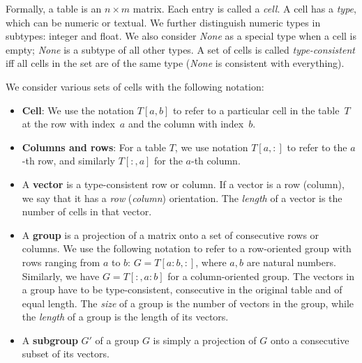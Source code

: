 \documentclass{sig-alternate-05-2015}
\newcommand{\groups}{\ensuremath{\mathcal{G}}\xspace}
\begin{document}
Formally, a table is an $n \times m$ matrix. Each entry is called a \textit{cell}.
A cell has a {\em type}, which can be numeric or textual. We further distinguish numeric types in subtypes: integer and float. We also consider \textit{None} as a special type when a cell is empty; \textit{None} is a subtype of all other types.
A set of cells is called \textit{type-consistent} iff all cells in the set are of the same type (\textit{None} is consistent with everything).

We consider various sets of cells with the following notation:
\begin{itemize}
  \item {\bf Cell}: We use the notation $T[a,b]$ to refer to a particular cell in the table~$T$ at the row with index~$a$ and the column with index~$b$.

  \item {\bf Columns and rows}: For a table $T$, we use notation $T[a,{:}]$ to refer to the $a$-th row, and similarly $T[{:},a]$ for the $a$-th column. %

  \item
  A \textbf{vector} is a type-consistent row or column.
  If a vector is a row (column), we say that it has a \textit{row} (\textit{column}) orientation. The \textit{length} of a vector is the number of cells in that vector.

  \item
  A \textbf{group} is a projection of a matrix onto a set of consecutive rows or columns. %
  We use the following notation to refer to a row-oriented group with rows ranging from $a$ to $b$: $G = T[a{:}b,:]$, where $a,b$ are natural numbers. Similarly, we have $G = T[{:},a{:}b]$ for a column-oriented group.
  The vectors in a group have to be type-consistent, consecutive in the original table and of equal length.
  The \textit{size} of a group is the number of vectors in the group, while the \textit{length} of a group is the length of its vectors. 

  \item
  A \textbf{subgroup} $G'$ of a group $G$ is simply a projection of $G$ onto a consecutive subset of its vectors. %
\end{itemize}
\end{document}
